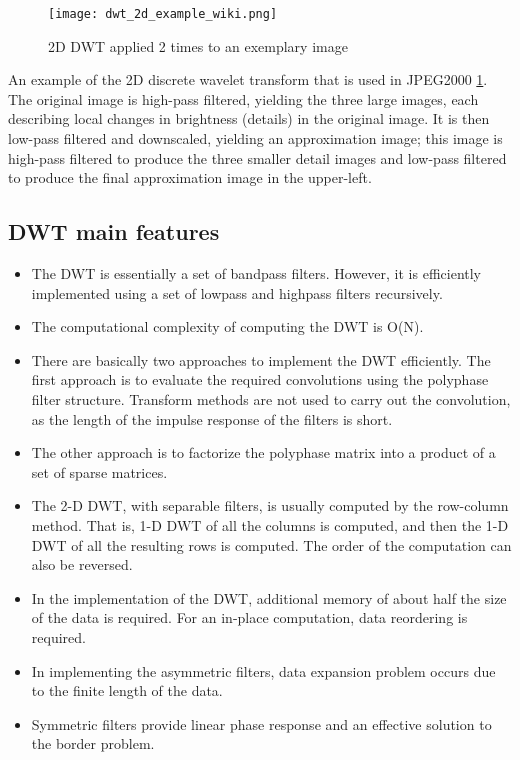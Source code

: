 \begin{figure}
    \centering
    \texttt{[image: dwt\_2d\_example\_wiki.png]}
    \caption{2D DWT applied 2 times to an exemplary image \cite{dwt_example_wiki}}
    \label{fig:dwt_2d_example_wiki}
\end{figure}

An example of the 2D discrete wavelet transform that is used in JPEG2000 \ref{fig:dwt_2d_example_wiki}.
The original image is high-pass filtered, yielding the three large images, each describing local changes
in brightness (details) in the original image. It is then low-pass filtered and downscaled, yielding
an approximation image; this image is high-pass filtered to produce the three smaller detail images and low-pass
filtered to produce the final approximation image in the upper-left. \cite{dwt_example_wiki}

\subsection{DWT main features}

\begin{itemize}
    \item The DWT is essentially a set of bandpass filters. However, it is efficiently implemented
    using a set of lowpass and highpass filters recursively.
    \item The computational complexity of computing the DWT is O(N).
    \item There are basically two approaches to implement the DWT efficiently. The first approach is
    to evaluate the required convolutions using the polyphase filter structure. Transform methods
    are not used to carry out the convolution, as the length of the impulse response of the
    filters is short.
    \item The other approach is to factorize the polyphase matrix into a product of a set of sparse
    matrices.
    \item The 2-D DWT, with separable filters, is usually computed by the row-column method. That
    is, 1-D DWT of all the columns is computed, and then the 1-D DWT of all the resulting
    rows is computed. The order of the computation can also be reversed.
    \item In the implementation of the DWT, additional memory of about half the size of the data is
    required. For an in-place computation, data reordering is required.
    \item In implementing the asymmetric filters, data expansion problem occurs due to the finite
    length of the data.
    \item Symmetric filters provide linear phase response and an effective solution to the border
    problem.
\end{itemize}

